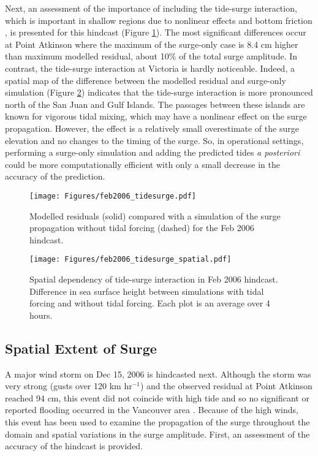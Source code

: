 \documentclass[letterpaper]{tATO2e}
\begin{document}
Next, an assessment of the importance of including the tide-surge interaction, which is important in shallow regions due to nonlinear effects and bottom friction \citep{bernier2007tide}, is presented for this hindcast (Figure \ref{fig:tidesurge}). The most significant differences occur at Point Atkinson where the maximum of the surge-only case is {\color{red} 8.4 cm} higher than maximum modelled residual, about 10\% of the total surge amplitude.  In contrast, the tide-surge interaction at Victoria is hardly noticeable. Indeed, a spatial map of the difference between the modelled residual and surge-only simulation (Figure \ref{fig:tidesurge_spatial}) indicates that the tide-surge interaction is more pronounced north of the San Juan and Gulf Islands. The passages between these islands are known for vigorous tidal mixing, which may have a nonlinear effect on the surge propagation. However, the effect is a relatively small overestimate of the surge elevation and no changes to the timing of the surge. So, in operational settings, performing a surge-only simulation and adding the predicted tides \textit{a posteriori} could be more computationally efficient with only a small decrease in the accuracy of the prediction. 

\begin{figure}
\centering
\texttt{[image: Figures/feb2006\_tidesurge.pdf]}
\caption{Modelled residuals (solid) compared with a simulation of the surge propagation without tidal forcing (dashed) for the Feb 2006 hindcast. }
\label{fig:tidesurge}
\end{figure}

\begin{figure}
\centering
\texttt{[image: Figures/feb2006\_tidesurge\_spatial.pdf]}
\caption{Spatial dependency of tide-surge interaction in Feb 2006 hindcast. Difference in sea surface height between simulations with tidal forcing and without tidal forcing. Each plot is an average over 4 hours. }
\label{fig:tidesurge_spatial}
\end{figure}


\subsection{Spatial Extent of Surge}\label{sec:spatial}
A major wind storm on Dec 15, 2006 is hindcasted next. Although the storm was very strong (gusts over 120 km hr$^{-1}$) and the observed residual at Point Atkinson reached {\color{red}94 cm}, this event did not coincide with high tide and so no significant or reported flooding occurred in the Vancouver area \citep{forseth2006adaptation}. Because of the high winds, this event has been used to examine the propagation of the surge throughout the domain and spatial variations in the surge amplitude. First, an assessment of the accuracy of the hindcast is provided. 
\end{document}
